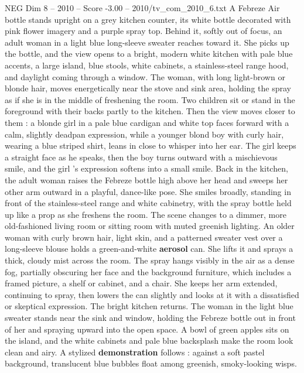 \begin{textsample}{NEG Dim 8 – 2010 – Score -3.00 – 2010/tv\_com\_2010\_6.txt}  \label{ex:f8_neg_073}
A Febreze Air bottle stands upright on a grey kitchen counter, its white bottle decorated with pink flower imagery and a purple spray top.
Behind it, softly out of focus, an adult woman in a light blue long-sleeve sweater reaches toward it.
She picks up the bottle, and the view opens to a bright, modern white kitchen with pale blue accents, a large island, blue stools, white cabinets, a stainless-steel range hood, and daylight coming through a window.
The woman, with long light-brown or blonde hair, moves energetically near the stove and sink area, holding the spray as if she is in the middle of freshening the room.
Two children sit or stand in the foreground with their backs partly to the kitchen.
Then the view moves closer to them : a blonde girl in a pale blue cardigan and white top faces forward with a calm, slightly deadpan expression, while a younger blond boy with curly hair, wearing a blue striped shirt, leans in close to whisper into her ear.
The girl keeps a straight face as he speaks, then the boy turns outward with a mischievous smile, and the girl ’s expression softens into a small smile.
Back in the kitchen, the adult woman raises the Febreze bottle high above her head and sweeps her other arm outward in a playful, dance-like pose.
She smiles broadly, standing in front of the stainless-steel range and white cabinetry, with the spray bottle held up like a prop as she freshens the room.
The scene changes to a dimmer, more old-fashioned living room or sitting room with muted greenish lighting.
An older woman with curly brown hair, light skin, and a patterned sweater vest over a long-sleeve blouse holds a green-and-white \textbf{aerosol} can.
She lifts it and sprays a thick, cloudy mist across the room.
The spray hangs visibly in the air as a dense fog, partially obscuring her face and the background furniture, which includes a framed picture, a shelf or cabinet, and a chair.
She keeps her arm extended, continuing to spray, then lowers the can slightly and looks at it with a dissatisfied or skeptical expression.
The bright kitchen returns.
The woman in the light blue sweater stands near the sink and window, holding the Febreze bottle out in front of her and spraying upward into the open space.
A bowl of green apples sits on the island, and the white cabinets and pale blue backsplash make the room look clean and airy.
A stylized \textbf{demonstration} follows : against a soft pastel background, translucent blue bubbles float among greenish, smoky-looking wisps.

\end{textsample}
